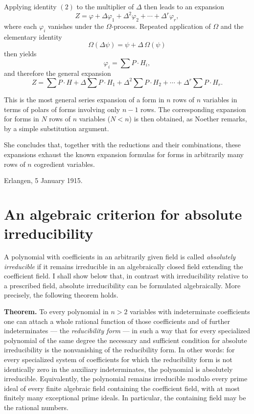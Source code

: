 \documentclass[11pt]{article}
\begin{document}
Applying identity \((2)\) to the multiplier of \(\Delta\) then leads to an expansion
\[
Z=\varphi+\Delta\varphi_1+\Delta^2\varphi_2+\cdots+\Delta^r\varphi_r,
\]
where each \(\varphi_i\) vanishes under the \(\Omega\)-process. Repeated application of \(\Omega\) and the elementary identity
\[
\Omega(\Delta\psi)=\psi+\Delta\,\Omega(\psi)
\]
then yields
\[
\varphi_i=\sum P\cdot H_i,
\]
and therefore the general expansion
\[
Z=
\sum P\cdot H
+\Delta\sum P\cdot H_1
+\Delta^2\sum P\cdot H_2
+\cdots
+\Delta^r\sum P\cdot H_r.
\tag{3}
\]

This is the most general series expansion of a form in \(n\) rows of \(n\) variables in terms of polars of forms involving only \(n-1\) rows. The corresponding expansion for forms in \(N\) rows of \(n\) variables (\(N<n\)) is then obtained, as Noether remarks, by a simple substitution argument.

She concludes that, together with the reductions and their combinations, these expansions exhaust the known expansion formulas for forms in arbitrarily many rows of \(n\) cogredient variables.

\medskip
\noindent
Erlangen, 5 January 1915.

\clearpage

\section*{An algebraic criterion for absolute irreducibility}

A polynomial with coefficients in an arbitrarily given field is called \emph{absolutely irreducible} if it remains irreducible in an algebraically closed field extending the coefficient field. I shall show below that, in contrast with irreducibility relative to a prescribed field, absolute irreducibility can be formulated algebraically. More precisely, the following theorem holds.

\medskip
\noindent\textbf{Theorem.}
To every polynomial in $n>2$ variables with indeterminate coefficients one can attach a whole rational function of those coefficients and of further indeterminates --- the \emph{reducibility form} --- in such a way that for every specialized polynomial of the same degree the necessary and sufficient condition for absolute irreducibility is the nonvanishing of the reducibility form. In other words: for every specialized system of coefficients for which the reducibility form is not identically zero in the auxiliary indeterminates, the polynomial is absolutely irreducible. Equivalently, the polynomial remains irreducible modulo every prime ideal of every finite algebraic field containing the coefficient field, with at most finitely many exceptional prime ideals. In particular, the containing field may be the rational numbers.
\end{document}
